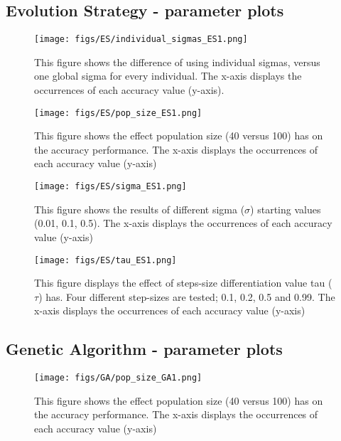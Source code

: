 \documentclass{article}
\begin{document}
\subsection{Evolution Strategy - parameter plots}
\label{subsecA:ES}

\begin{figure*}[htbp]
    \centering
    \texttt{[image: figs/ES/individual\_sigmas\_ES1.png]}
    \caption{
    This figure shows the difference of using individual sigmas, versus one global sigma for every individual. 
    The x-axis displays the occurrences of each accuracy value (y-axis).
    }
    \label{fig:A_ES_indivsigma}
\end{figure*}



\begin{figure*}[htbp]
    \centering
    \texttt{[image: figs/ES/pop\_size\_ES1.png]}
    \caption{
    This figure shows the effect population size (40 versus 100) has on the accuracy performance. 
    The x-axis displays the occurrences of each accuracy value (y-axis) 
    }
    \label{fig:A_ES_popsize}
\end{figure*}


\begin{figure*}[htbp]
    \centering
    \texttt{[image: figs/ES/sigma\_ES1.png]}
    \caption{
    This figure shows the results of different sigma ($\sigma$) starting values (0.01, 0.1, 0.5). 
    The x-axis displays the occurrences of each accuracy value (y-axis)
    }
    \label{fig:A_ES_sigmas}
\end{figure*}


\begin{figure*}[htbp]
    \centering
    \texttt{[image: figs/ES/tau\_ES1.png]}
    \caption{
    This figure displays the effect of steps-size differentiation value tau ($\tau$) has. 
    Four different step-sizes are tested; 0.1, 0.2, 0.5 and 0.99. 
    The x-axis displays the occurrences of each accuracy value (y-axis)
    }
    \label{fig:A_ES_tau}
\end{figure*}

\newpage

\subsection{Genetic Algorithm - parameter plots}
\label{subsecA:GA}



\begin{figure*}[htbp]
    \centering
    \texttt{[image: figs/GA/pop\_size\_GA1.png]}
    \caption{
    This figure shows the effect population size (40 versus 100) has on the accuracy performance. 
    The x-axis displays the occurrences of each accuracy value (y-axis) 
    }
    \label{fig:A_GA_popsize}
\end{figure*}
\end{document}
